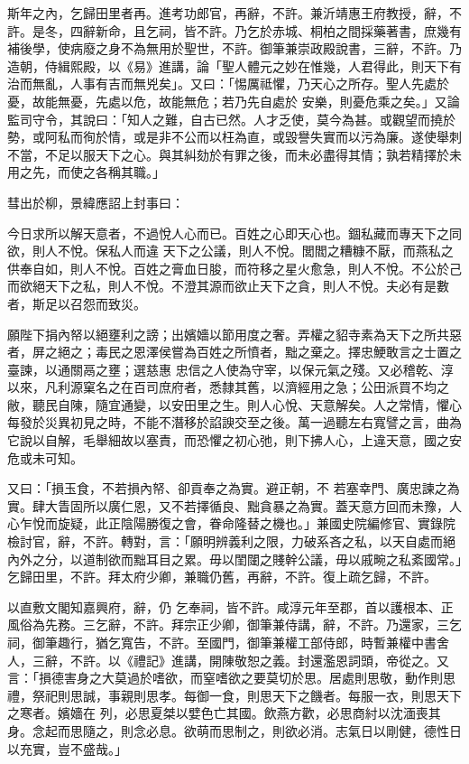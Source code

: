 \begin{pinyinscope}
 斯年之內，乞歸田里者再。進考功郎官，再辭，不許。兼沂靖惠王府教授，辭，不許。是冬，四辭新命，且乞祠，皆不許。乃乞於赤城、桐柏之間採藥著書，庶幾有補後學，使病廢之身不為無用於聖世，不許。御筆兼崇政殿說書，三辭，不許。乃造朝，侍緝熙殿，以《易》進講，論「聖人體元之妙在惟幾，人君得此，則天下有治而無亂，人事有吉而無兇矣」。又曰：「惕厲祗懼，乃天心之所存。聖人先處於憂，故能無憂，先處以危，故能無危；若乃先自處於
 安樂，則憂危乘之矣。」又論監司守令，其說曰：「知人之難，自古已然。人才乏使，莫今為甚。或觀望而撓於勢，或阿私而徇於情，或是非不公而以枉為直，或毀譽失實而以污為廉。遂使舉刺不當，不足以服天下之心。與其糾劾於有罪之後，而未必盡得其情；孰若精擇於未用之先，而使之各稱其職。」



 彗出於柳，景緯應詔上封事曰：



 今日求所以解天意者，不過悅人心而已。百姓之心即天心也。錮私藏而專天下之同欲，則人不悅。保私人而違
 天下之公議，則人不悅。閭閻之糟糠不厭，而燕私之供奉自如，則人不悅。百姓之膏血日朘，而符移之星火愈急，則人不悅。不公於己而欲絕天下之私，則人不悅。不澄其源而欲止天下之貪，則人不悅。夫必有是數者，斯足以召怨而致災。



 願陛下捐內帑以絕壅利之謗；出嬪嬙以節用度之奢。弄權之貂寺素為天下之所共惡者，屏之絕之；毒民之恩澤侯嘗為百姓之所憤者，黜之棄之。擇忠鯁敢言之士置之臺諫，以通關鬲之壅；選慈惠
 忠信之人使為守宰，以保元氣之殘。又必稽乾、淳以來，凡利源窠名之在百司庶府者，悉隸其舊，以濟經用之急；公田派買不均之敝，聽民自陳，隨宜通變，以安田里之生。則人心悅、天意解矣。人之常情，懼心每發於災異初見之時，不能不潛移於諂諛交至之後。萬一過聽左右寬譬之言，曲為它說以自解，毛舉細故以塞責，而恐懼之初心弛，則下拂人心，上違天意，國之安危或未可知。



 又曰：「損玉食，不若損內帑、卻貢奉之為實。避正朝，不
 若塞幸門、廣忠諫之為實。肆大眚固所以廣仁恩，又不若擇循良、黜貪暴之為實。蓋天意方回而未豫，人心乍悅而旋疑，此正陰陽勝復之會，眷命隆替之機也。」兼國史院編修官、實錄院檢討官，辭，不許。轉對，言：「願明辨義利之限，力破系吝之私，以天自處而絕內外之分，以道制欲而黜耳目之累。毋以閨闥之賤幹公議，毋以戚畹之私紊國常。」乞歸田里，不許。拜太府少卿，兼職仍舊，再辭，不許。復上疏乞歸，不許。



 以直敷文閣知嘉興府，辭，仍
 乞奉祠，皆不許。咸淳元年至郡，首以護根本、正風俗為先務。三乞辭，不許。拜宗正少卿，御筆兼侍講，辭，不許。乃還家，三乞祠，御筆趣行，猶乞寬告，不許。至國門，御筆兼權工部侍郎，時暫兼權中書舍人，三辭，不許。以《禮記》進講，開陳敬恕之義。封還濫恩詞頭，帝從之。又言：「損德害身之大莫過於嗜欲，而窒嗜欲之要莫切於思。居處則思敬，動作則思禮，祭祀則思誠，事親則思孝。每御一食，則思天下之饑者。每服一衣，則思天下之寒者。嬪嬙在
 列，必思夏桀以嬖色亡其國。飲燕方歡，必思商紂以沈湎喪其身。念起而思隨之，則念必息。欲萌而思制之，則欲必消。志氣日以剛健，德性日以充實，豈不盛哉。」




\end{pinyinscope}
